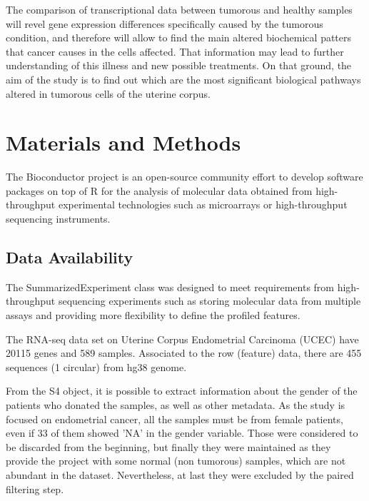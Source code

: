 \documentclass[9pt,twocolumn,twoside]{gsajnl}
\begin{document}
The comparison of transcriptional data between tumorous and healthy samples will revel gene expression differences specifically caused by the tumorous condition, and therefore will allow to find the main altered biochemical patters that cancer causes in the cells affected. That information may lead to further understanding of this illness and new possible treatments.
On that ground, the aim of the study is to find out which are the most significant biological pathways altered in tumorous cells of the uterine corpus. 

\section*{Materials and Methods}

The Bioconductor project \citep{Gentleman2004} is an open-source community effort to develop software packages on top of R for the analysis of molecular data obtained from high-throughput experimental technologies such as microarrays or high-throughput sequencing instruments.


\subsection*{Data Availability}
The SummarizedExperiment \citep{SummarizedExperiment} class was designed to meet requirements from high-throughput sequencing experiments such as storing molecular data from multiple assays and providing more flexibility to define the profiled features.

The RNA-seq data set on Uterine Corpus Endometrial Carcinoma (UCEC) have 20115 genes and 589 samples. Associated to the row (feature) data, there are 455 sequences (1 circular) from hg38 genome.

From the S4 object, it is possible to extract information about the gender of the patients who donated the samples, as well as other metadata. As the study is focused on endometrial cancer, all the samples must be from female patients, even if 33 of them showed 'NA' in the gender variable. Those were considered to be discarded from the beginning, but finally they were maintained as they provide the project with some normal (non tumorous) samples, which are not abundant in the dataset. Nevertheless, at last they were excluded by the paired filtering step. 
\end{document}
